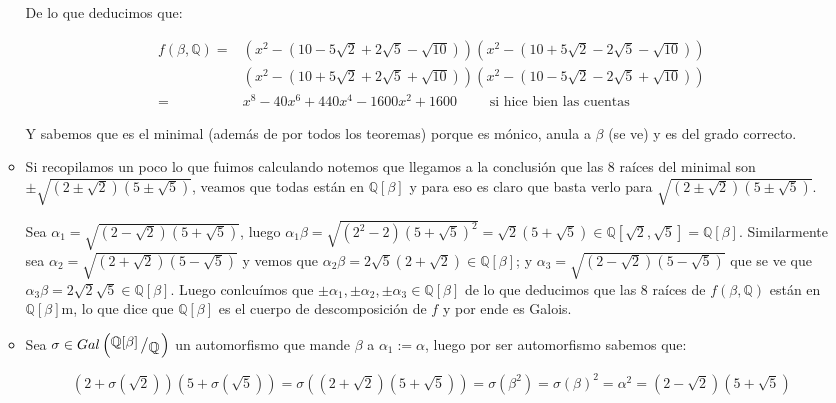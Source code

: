 \documentclass[11pt]{article}
\newcommand{\Q}{\mathbb{Q}}
\newcommand{\quotient}[2]{{\raisebox{.2em}{$#1$}\left/\raisebox{-.2em}{$#2$}\right.}}
\numberwithin{theorem}{subsection}
\begin{document}
\begin{enumerate}
\begin{itemize}
		De lo que deducimos que:
		
		\begin{equation*}
		\begin{aligned}
		f \left(\beta, \Q\right) = & \left(x^2 - \left(10 -5\sqrt{2} + 2\sqrt{5} - \sqrt{10}\right)\right)\left(x^2 - \left(10 +5\sqrt{2} - 2\sqrt{5} - \sqrt{10}\right)\right) \\
		& \left(x^2 - \left(10 +5\sqrt{2} + 2\sqrt{5} + \sqrt{10}\right)\right)\left(x^2 - \left(10 -5\sqrt{2} - 2\sqrt{5} + \sqrt{10}\right)\right) \\
		= & x^8 - 40x^6 + 440x^4 - 1600 x^2 +1600 \qquad \text{ si hice bien las cuentas}
		\end{aligned}
		\end{equation*}
		
		Y sabemos que es el minimal (adem\'as de por todos los teoremas) porque es m\'onico, anula a $\beta$ (se ve) y es del grado correcto.
		
		\item Si recopilamos un poco lo que fuimos calculando notemos que llegamos a la conclusi\'on que las 8 ra\'ices del minimal son $\pm\sqrt{\left(2 \pm \sqrt{2}\right)\left(5 \pm \sqrt{5}\right)}$, veamos que todas est\'an en $\Q[\beta]$ y para eso es claro que basta verlo para $\sqrt{\left(2 \pm \sqrt{2}\right)\left(5 \pm \sqrt{5}\right)}$.
		
		Sea $\alpha_1 = \sqrt{\left(2 - \sqrt{2}\right) \left(5 +\sqrt{5}\right)}$, luego $\alpha_1\beta = \sqrt{\left(2^2 - 2\right)\left(5 + \sqrt{5}\right)^2} = \sqrt{2}\left(5 + \sqrt{5}\right) \in \Q[\sqrt{2}, \sqrt{5}] = \Q[\beta]$. Similarmente sea $\alpha_2 = \sqrt{\left(2 + \sqrt{2}\right) \left(5 -\sqrt{5}\right)}$ y vemos que $\alpha_2\beta = 2\sqrt{5}\left(2+\sqrt{2}\right) \in \Q[\beta]$; y $\alpha_3 = \sqrt{\left(2 - \sqrt{2}\right) \left(5 -\sqrt{5}\right)}$ que se ve que $\alpha_3\beta = 2\sqrt{2}\sqrt{5} \in \Q[\beta]$. Luego conlcu\'imos que $\pm \alpha_1, \pm \alpha_2, \pm \alpha_3 \in \Q[\beta]$ de lo que deducimos que las $8$ ra\'ices de $f\left(\beta, \Q\right)$ est\'an en $\Q[\beta]$m, lo que dice que $\Q[\beta]$ es el cuerpo de descomposici\'on de $f$ y por ende es Galois.
		
		\item Sea $\sigma \in Gal\left(\quotient{\Q[\beta]}{\Q}\right)$ un automorfismo que mande $\beta$ a $\alpha_1 := \alpha$, luego por ser automorfismo sabemos que:
		
		\begin{equation*}
			\left(2 + \sigma(\sqrt{2})\right)\left(5 + \sigma(\sqrt{5})\right) = \sigma\left(\left(2 + \sqrt{2}\right)\left(5 + \sqrt{5}\right)\right) = \sigma(\beta^2) = \sigma(\beta)^2 = \alpha^2 = \left(2 - \sqrt{2}\right) \left(5 +\sqrt{5}\right)
		\end{equation*}
		

\end{itemize}
\end{enumerate}
\end{document}
